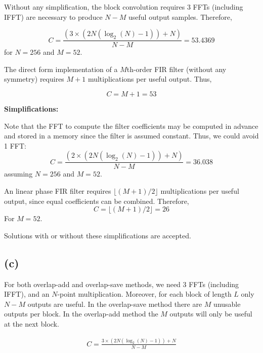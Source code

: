 \documentclass{article}
\begin{document}
Without any simplification, the block convolution requires 3 FFTs (including IFFT) are necessary to produce $N-M$ useful output samples. Therefore,

\begin{equation}
	C = \frac{(3\times (2N(\log_2(N)-1)) + N)}{N-M} = 53.4369 \tag{block convolution}
\end{equation}
for $N = 256$ and $M = 52$.

The direct form implementation of a $M$th-order FIR filter (without any symmetry) requires $M+1$ multiplications per useful output. Thus,

\begin{equation}
C = M+1 = 53 \tag{FIR direct implementation}
\end{equation}

\noindent\textbf{Simplifications:}

Note that the FFT to compute the filter coefficients may be computed in advance and stored in a memory since the filter is assumed constant. Thus, we could avoid 1 FFT:
\begin{equation}
C = \frac{(2\times (2N(\log_2(N)-1)) + N)}{N-M} = 36.038 \tag{block convolution}
\end{equation}
assuming $N = 256$ and $M = 52$.

An linear phase FIR filter requires $\lfloor (M+1)/2 \rfloor$ multiplications per useful output, since equal coefficients can be combined. Therefore, 
\begin{equation}
C = \lfloor (M+1)/2 \rfloor =  26 \tag{linear phase FIR direct implementation}
\end{equation}
For $M = 52$.

Solutions with or without these simplifications are accepted.

\subsection{(c)}
For both overlap-add and overlap-save methods, we need 3 FFTs (including IFFT), and an $N$-point multiplication. Moreover, for each block of length $L$ only $N - M$ outputs are useful. In the overlap-save method there are $M$ unusable outputs per block. In the overlap-add method the $M$ outputs will only be useful at the next block.

\begin{align}
C = \frac{3\times (2N(\log_2(N)-1)) + N}{N-M} \tag{block convolution}
\end{align}
\end{document}
